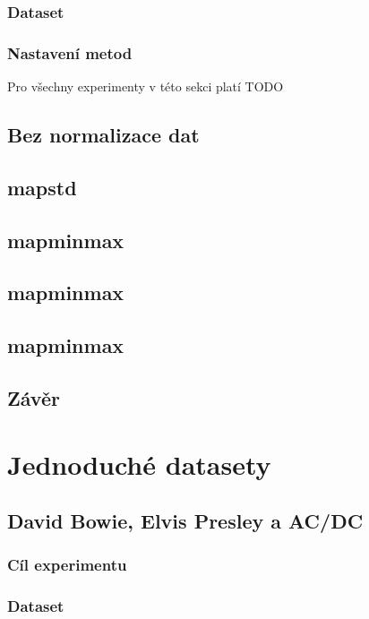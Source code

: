 \documentclass[thesis=M,czech]{FITthesis}[2012/06/26]
\begin{document}
\subsubsection*{Dataset}

\subsubsection*{Nastavení metod}
Pro všechny experimenty v této sekci platí TODO

\subsection{Bez normalizace dat}

\subsection{mapstd}

\subsection{mapminmax}


\subsection{mapminmax}

\subsection{mapminmax}

\subsection{Závěr}


\section{Jednoduché datasety}

\subsection{David Bowie, Elvis Presley a AC/DC}
\subsubsection*{Cíl experimentu}
\subsubsection*{Dataset}
\end{document}
